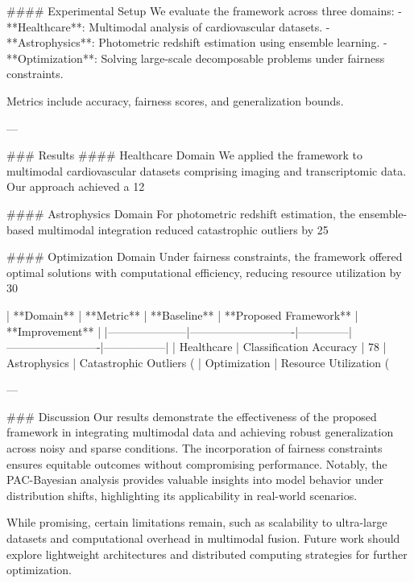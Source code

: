 #### Experimental Setup  
We evaluate the framework across three domains:  
- **Healthcare**: Multimodal analysis of cardiovascular datasets.  
- **Astrophysics**: Photometric redshift estimation using ensemble learning.  
- **Optimization**: Solving large-scale decomposable problems under fairness constraints.  

Metrics include accuracy, fairness scores, and generalization bounds.  

---

### Results  
#### Healthcare Domain  
We applied the framework to multimodal cardiovascular datasets comprising imaging and transcriptomic data. Our approach achieved a 12%

#### Astrophysics Domain  
For photometric redshift estimation, the ensemble-based multimodal integration reduced catastrophic outliers by 25%

#### Optimization Domain  
Under fairness constraints, the framework offered optimal solutions with computational efficiency, reducing resource utilization by 30%

| **Domain**         | **Metric**                 | **Baseline** | **Proposed Framework** | **Improvement** |
|---------------------|----------------------------|--------------|-------------------------|-----------------|
| Healthcare          | Classification Accuracy    | 78%
| Astrophysics        | Catastrophic Outliers (%
| Optimization        | Resource Utilization (%

---

### Discussion  
Our results demonstrate the effectiveness of the proposed framework in integrating multimodal data and achieving robust generalization across noisy and sparse conditions. The incorporation of fairness constraints ensures equitable outcomes without compromising performance. Notably, the PAC-Bayesian analysis provides valuable insights into model behavior under distribution shifts, highlighting its applicability in real-world scenarios.  

While promising, certain limitations remain, such as scalability to ultra-large datasets and computational overhead in multimodal fusion. Future work should explore lightweight architectures and distributed computing strategies for further optimization.  

